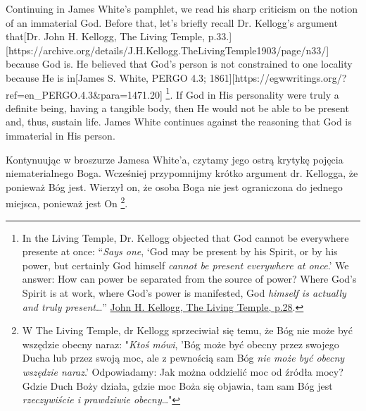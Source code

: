 Continuing in James White’s pamphlet, we read his sharp criticism on the notion of an immaterial God. Before that, let’s briefly recall Dr. Kellogg’s argument that[Dr. John H. Kellogg, The Living Temple, p.33.][https://archive.org/details/J.H.Kellogg.TheLivingTemple1903/page/n33/] because God is. He believed that God’s person is not constrained to one locality because He is in[James S. White, PERGO 4.3; 1861][https://egwwritings.org/?ref=en\_PERGO.4.3&para=1471.20] \footnote{In the Living Temple, Dr. Kellogg objected that God cannot be everywhere presente at once: “\textit{Says one}, ‘God may be present by his Spirit, or by his power, but certainly God himself \textit{cannot be present everywhere at once}.’ We answer: How can power be separated from the source of power? Where God’s Spirit is at work, where God’s power is manifested, God \textit{himself is actually and truly present}…” \href{https://archive.org/details/J.H.Kellogg.TheLivingTemple1903/page/n29/}{John H. Kellogg, The Living Temple, p.28}.}. If God in His personality were truly a definite being, having a tangible body, then He would not be able to be present and, thus, sustain life. James White continues against the reasoning that God is immaterial in His person.


Kontynuując w broszurze Jamesa White'a, czytamy jego ostrą krytykę pojęcia niematerialnego Boga. Wcześniej przypomnijmy krótko argument dr. Kellogga, że ponieważ Bóg jest. Wierzył on, że osoba Boga nie jest ograniczona do jednego miejsca, ponieważ jest On \footnote{W The Living Temple, dr Kellogg sprzeciwiał się temu, że Bóg nie może być wszędzie obecny naraz: "\textit{Ktoś mówi}, 'Bóg może być obecny przez swojego Ducha lub przez swoją moc, ale z pewnością sam Bóg \textit{nie może być obecny wszędzie naraz}.' Odpowiadamy: Jak można oddzielić moc od źródła mocy? Gdzie Duch Boży działa, gdzie moc Boża się objawia, tam sam Bóg jest \textit{rzeczywiście i prawdziwie obecny}…"}.





